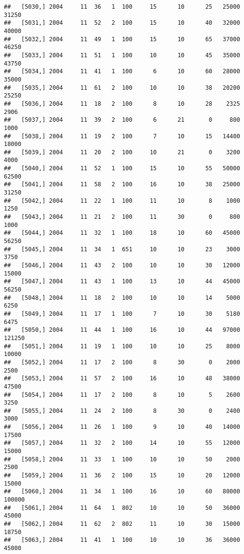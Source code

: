 \documentclass{article}\usepackage[]{graphicx}\usepackage[]{color}
\makeatletter
\newenvironment{kframe}{%
 \def\at@end@of@kframe{}%
 \ifinner\ifhmode%
  \def\at@end@of@kframe{\end{minipage}}%
  \begin{minipage}{\columnwidth}%
 \fi\fi%
 \def\FrameCommand##1{\hskip\@totalleftmargin \hskip-\fboxsep
 \colorbox{shadecolor}{##1}\hskip-\fboxsep
     \hskip-\linewidth \hskip-\@totalleftmargin \hskip\columnwidth}%
 \MakeFramed {\advance\hsize-\width
   \@totalleftmargin\z@ \linewidth\hsize
   \@setminipage}}%
 {\par\unskip\endMakeFramed%
 \at@end@of@kframe}
\newenvironment{knitrout}{}{} %
\makeatother
\begin{document}
\begin{knitrout}
\begin{kframe}
\begin{verbatim}
##   [5030,] 2004     11  36   1  100     15      10      25   25000   31250
##   [5031,] 2004     11  52   2  100     15      10      40   32000   40000
##   [5032,] 2004     11  49   1  100     15      10      65   37000   46250
##   [5033,] 2004     11  51   1  100     10      10      45   35000   43750
##   [5034,] 2004     11  41   1  100      6      10      60   28000   35000
##   [5035,] 2004     11  61   2  100     10      10      38   20200   25250
##   [5036,] 2004     11  18   2  100      8      10      28    2325    2906
##   [5037,] 2004     11  39   2  100      6      21       0     800    1000
##   [5038,] 2004     11  19   2  100      7      10      15   14400   18000
##   [5039,] 2004     11  20   2  100     10      21       0    3200    4000
##   [5040,] 2004     11  52   1  100     15      10      55   50000   62500
##   [5041,] 2004     11  58   2  100     16      10      38   25000   31250
##   [5042,] 2004     11  22   1  100     11      10       8    1000    1250
##   [5043,] 2004     11  21   2  100     11      30       0     800    1000
##   [5044,] 2004     11  32   1  100     18      10      60   45000   56250
##   [5045,] 2004     11  34   1  651     10      10      23    3000    3750
##   [5046,] 2004     11  43   2  100     10      10      30   12000   15000
##   [5047,] 2004     11  43   1  100     13      10      44   45000   56250
##   [5048,] 2004     11  18   2  100     10      10      14    5000    6250
##   [5049,] 2004     11  17   1  100      7      10      30    5180    6475
##   [5050,] 2004     11  44   1  100     16      10      44   97000  121250
##   [5051,] 2004     11  19   1  100     10      10      25    8000   10000
##   [5052,] 2004     11  17   2  100      8      30       0    2000    2500
##   [5053,] 2004     11  57   2  100     16      10      48   38000   47500
##   [5054,] 2004     11  17   2  100      8      10       5    2600    3250
##   [5055,] 2004     11  24   2  100      8      30       0    2400    3000
##   [5056,] 2004     11  26   1  100      9      10      40   14000   17500
##   [5057,] 2004     11  32   2  100     14      10      55   12000   15000
##   [5058,] 2004     11  33   1  100     10      10      50    2000    2500
##   [5059,] 2004     11  36   2  100     15      10      20   12000   15000
##   [5060,] 2004     11  34   1  100     16      10      60   80000  100000
##   [5061,] 2004     11  64   1  802     10      10      50   36000   45000
##   [5062,] 2004     11  62   2  802     11      10      30   15000   18750
##   [5063,] 2004     11  41   1  100     10      10      36   36000   45000

\end{verbatim}
\end{kframe}
\end{knitrout}
\end{document}
